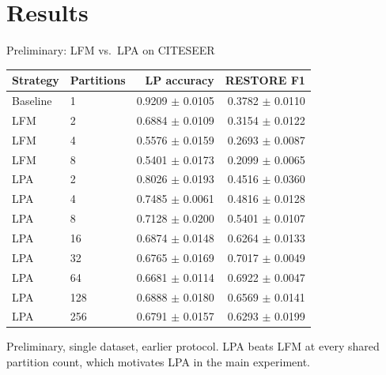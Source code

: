 \documentclass[aspectratio=169]{beamer}
\begin{document}
\section{Results}

\begin{frame}{Preliminary: LFM vs.\ LPA on CITESEER}
  \scriptsize
  \begin{tabular}{llrr}
    \toprule
    Strategy & Partitions & LP accuracy & RESTORE F1 \\
    \midrule
    Baseline & 1  & 0.9209 $\pm$ 0.0105 & 0.3782 $\pm$ 0.0110 \\
    \midrule
    LFM      & 2  & 0.6884 $\pm$ 0.0109 & 0.3154 $\pm$ 0.0122 \\
    LFM      & 4  & 0.5576 $\pm$ 0.0159 & 0.2693 $\pm$ 0.0087 \\
    LFM      & 8  & 0.5401 $\pm$ 0.0173 & 0.2099 $\pm$ 0.0065 \\
    \midrule
    LPA      & 2  & 0.8026 $\pm$ 0.0193 & 0.4516 $\pm$ 0.0360 \\
    LPA      & 4  & 0.7485 $\pm$ 0.0061 & 0.4816 $\pm$ 0.0128 \\
    LPA      & 8  & 0.7128 $\pm$ 0.0200 & 0.5401 $\pm$ 0.0107 \\
    LPA      & 16 & 0.6874 $\pm$ 0.0148 & 0.6264 $\pm$ 0.0133 \\
    LPA      & 32 & 0.6765 $\pm$ 0.0169 & 0.7017 $\pm$ 0.0049 \\
    LPA      & 64 & 0.6681 $\pm$ 0.0114 & 0.6922 $\pm$ 0.0047 \\
    LPA      & 128 & 0.6888 $\pm$ 0.0180 & 0.6569 $\pm$ 0.0141 \\
    LPA      & 256 & 0.6791 $\pm$ 0.0157 & 0.6293 $\pm$ 0.0199 \\
    \bottomrule
  \end{tabular}
  \vspace{0.5em}

  \small Preliminary, single dataset, earlier protocol. LPA beats LFM at every shared partition count, which motivates LPA in the main experiment.
\end{frame}
\end{document}
